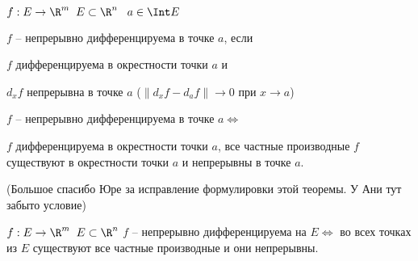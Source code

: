 
\begin{definition}\slashns
	
	$f: E \to \R^m \;\; E \subset \R^n \;\;\; a \in \Int E$
	
	$f$ -- непрерывно дифференцируема в точке $a$, если 

	$f$ дифференцируема в окрестности точки $a$ и 

	$d_x f$ непрерывна в точке $a$ ($\left\| d_x f - d_a f \right\| \to 0$ при $x \to a$)
\end{definition}

\begin{theorem}\slashns
	
	$f$ -- непрерывно дифференцируема в точке $a \iff$
	
	$f$ дифференцируема в окрестности точки $a$, все частные производные $f$ существуют в окрестности точки $a$ и непрерывны в точке $a$.

	(Большое спасибо Юре за исправление формулировки этой теоремы. У Ани тут забыто условие)
\end{theorem}


\begin{consequence}
	
	$f: E \to \R^m \;\; E \subset \R^n$
	$f$ -- непрерывно дифференцируема на $E \iff$ во всех точках из $E$ существуют все частные производные и они непрерывны.
\end{consequence}

